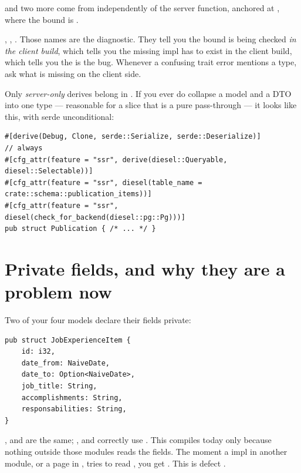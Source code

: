 and two more come from  independently of the server function, anchored at
, where the bound is
.

\begin{pitfall}
, , . Those names are the
diagnostic. They tell you the bound is being checked \emph{in the client build}, which tells you
the missing impl has to exist in the client build, which tells you the  is the
bug. Whenever a confusing trait error mentions a  type, ask what is missing on the
client side.
\end{pitfall}

Only \emph{server-only} derives belong in . If you ever do collapse a model and a
DTO into one type --- reasonable for a slice that is a pure pass-through --- it looks like this,
with serde unconditional:

\begin{lstlisting}[style=rs]
#[derive(Debug, Clone, serde::Serialize, serde::Deserialize)]        // always
#[cfg_attr(feature = "ssr", derive(diesel::Queryable, diesel::Selectable))]
#[cfg_attr(feature = "ssr", diesel(table_name = crate::schema::publication_items))]
#[cfg_attr(feature = "ssr", diesel(check_for_backend(diesel::pg::Pg)))]
pub struct Publication { /* ... */ }
\end{lstlisting}

\section{Private fields, and why they are a problem now}

Two of your four models declare their fields private:

\begin{lstlisting}[style=rs,caption={\file{src/job\_experience/model.rs} --- no \code{pub} on any field.}]
pub struct JobExperienceItem {
    id: i32,
    date_from: NaiveDate,
    date_to: Option<NaiveDate>,
    job_title: String,
    accomplishments: String,
    responsabilities: String,
}
\end{lstlisting}

,  and  are the same;
,  and  correctly use . This
compiles today only because nothing outside those modules reads the fields. The moment a
 impl in another module, or a page in , tries to read , you
get . This is
defect .

